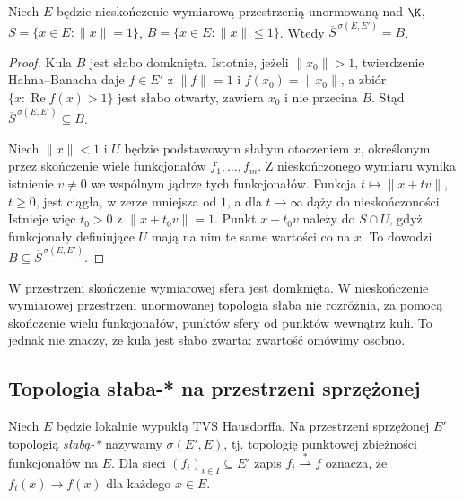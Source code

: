 \begin{twierdzenie}
\label{thm:sfera-slaba}
Niech $E$ będzie nieskończenie wymiarową przestrzenią
unormowaną nad $\K$, $S=\{x\in E:\|x\|=1\}$,
$B=\{x\in E:\|x\|\le1\}$. Wtedy
$\overline S^{\,\sigma(E,E')}=B$.
\end{twierdzenie}
\begin{proof}
Kula $B$ jest słabo domknięta. Istotnie, jeżeli
$\|x_0\|>1$, twierdzenie Hahna--Banacha daje
$f\in E'$ z $\|f\|=1$ i $f(x_0)=\|x_0\|$,
a zbiór $\{x:\operatorname{Re}f(x)>1\}$ jest słabo
otwarty, zawiera $x_0$ i nie przecina $B$.
Stąd $\overline S^{\,\sigma(E,E')}\subseteq B$.

Niech $\|x\|<1$ i $U$ będzie podstawowym słabym
otoczeniem $x$, określonym przez skończenie wiele
funkcjonałów $f_1,\ldots,f_m$. Z nieskończonego wymiaru
wynika istnienie $v\ne0$ we wspólnym jądrze tych
funkcjonałów. Funkcja $t\mapsto\|x+tv\|$, $t\ge0$,
jest ciągła, w zerze mniejsza od $1$, a dla $t\to\infty$
dąży do nieskończoności. Istnieje więc $t_0>0$
z $\|x+t_0v\|=1$. Punkt $x+t_0v$ należy do
$S\cap U$, gdyż funkcjonały definiujące $U$ mają
na nim te same wartości co na $x$. To dowodzi
$B\subseteq\overline S^{\,\sigma(E,E')}$.
\end{proof}

\begin{uwaga}
W przestrzeni skończenie wymiarowej sfera jest domknięta.
W nieskończenie wymiarowej przestrzeni unormowanej topologia
słaba nie rozróżnia, za pomocą skończenie wielu funkcjonałów,
punktów sfery od punktów wewnątrz kuli. To jednak nie znaczy,
że kula jest słabo zwarta: zwartość omówimy osobno.
\end{uwaga}

\subsection{Topologia słaba-* na przestrzeni sprzężonej}

\begin{definicja}\label{def:slaba-gwiazdka}
Niech $E$ będzie lokalnie wypukłą TVS Hausdorffa.
Na przestrzeni sprzężonej $E'$ topologią
\emph{słabą-*} nazywamy $\sigma(E',E)$, tj. topologię
punktowej zbieżności funkcjonałów na $E$. Dla sieci
$(f_i)_{i\in I}\subseteq E'$ zapis
$f_i\overset{*}{\rightharpoonup}f$ oznacza, że
$f_i(x)\to f(x)$ dla każdego $x\in E$.
\end{definicja}

